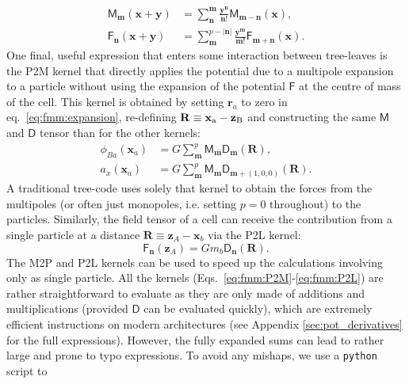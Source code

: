 \begin{align}
  \mathsf{M}_{\mathbf{m}}(\mathbf{x} + \mathbf{y}) &=
  \sum_{\mathbf{n}}^{\mathbf{m}}
  \frac{\mathbf{y}^\mathbf{n}}{\mathbf{n}!}\mathsf{M}_{\mathbf{m} -
    \mathbf{n}}(\mathbf{x}), \label{eq:fmm:M2M} \\
  \mathsf{F}_{\mathbf{n}}(\mathbf{x} + \mathbf{y}) &=
  \sum_{\mathbf{m}}^{p-|\mathbf{n}|}
  \frac{\mathbf{y}^\mathbf{m}}{\mathbf{m}!}\mathsf{F}_{\mathbf{m} +
    \mathbf{n}}(\mathbf{x}). \label{eq:fmm:L2L} 
\end{align}
One final, useful expression that enters some interaction between
tree-leaves is the P2M kernel that directly applies the potential due
to a multipole expansion to a particle without using the expansion of
the potential $\mathsf{F}$ at the centre of mass of the cell. This
kernel is obtained by setting $\mathbf{r}_a$ to zero in
eq.~\ref{eq:fmm:expansion}, re-defining
$\mathbf{R}\equiv\mathbf{x}_{\rm a} - \mathbf{z}_{\rm B}$ and
constructing the same $\mathsf{M}$ and $\mathsf{D}$ tensor than for
the other kernels:
\begin{align}
  \phi_{Ba}(\mathbf{x}_a) &= G\sum_{\mathbf{m}}^p \mathsf{M}_{\mathbf{m}} \mathsf{D}_{\mathbf{m}}(\mathbf{R}),\\
  a_x(\mathbf{x}_a) &= G\sum_{\mathbf{m}}^p \mathsf{M}_{\mathbf{m}} \mathsf{D}_{\mathbf{m}+\left(1,0,0\right)}(\mathbf{R}).
  \label{eq:fmm:M2P}
\end{align}
A traditional tree-code uses solely that kernel to obtain the forces from
the multipoles (or often just monopoles, i.e. setting $p=0$ throughout) to
the particles. Similarly, the field tensor of a cell can receive the
contribution from a single particle at a distance $\mathbf{R} \equiv
\mathbf{z}_A - \mathbf{x}_b$ via the P2L kernel:
\begin{equation}
  \mathsf{F}_{\mathbf{n}}(\mathbf{z}_A) = G m_b
  \mathsf{D}_{\mathbf{n}}(\mathbf{R}).
  \label{eq:fmm:P2L}
\end{equation}
The M2P and P2L kernels can be used to speed up the calculations
involving only as single particle.  All the kernels
(Eqs.~\ref{eq:fmm:P2M}-\ref{eq:fmm:P2L}) are rather straightforward to
evaluate as they are only made of additions and multiplications
(provided $\mathsf{D}$ can be evaluated quickly), which are extremely
efficient instructions on modern architectures (see Appendix
\ref{sec:pot_derivatives} for the full expressions). However, the
fully expanded sums can lead to rather large and prone to typo
expressions. To avoid any mishaps, we use a \texttt{python} script to
